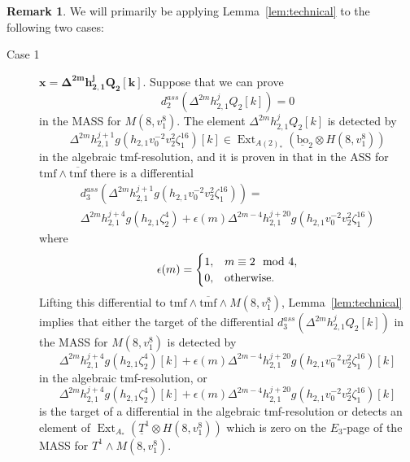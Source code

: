 \documentclass[10pt]{amsart}
\newcommand{\ul}[1]{\underline{#1}}
\newcommand{\br}[1]{\overline{#1}}
\newcommand{\tmf}{\mathrm{tmf}}
\newcommand{\bo}{\mathrm{bo}}
\newcommand{\bou}{\ul{\bo}}
\theoremstyle{definition}
\newtheorem{rmk}[equation]{Remark}
\numberwithin{equation}{section}
\numberwithin{figure}{section}
\DeclareMathOperator{\Ext}{Ext}
\begin{document}
\begin{rmk}\label{rmk:technical}
We will primarily be applying Lemma~\ref{lem:technical} to the following two cases:
\begin{description}
\item[Case 1] $\pmb{x = \Delta^{2m} h^{j}_{2,1}Q_2[k]}$.  Suppose that we can prove 
$$ d^{ass}_2(\Delta^{2m} h^{j}_{2,1}Q_2[k]) = 0 $$ 
in the MASS for $M(8,v_1^8)$.  The element $\Delta^{2m} h^{j}_{2,1}Q_2[k]$ is detected by 
$$ \Delta^{2m} h^{j+1}_{2,1} g(h_{2,1}v_0^{-2}v_2^2\zeta_1^{16})[k] \in \Ext_{A(2)_*}(\bou_2 \otimes H(8,v_1^8)) $$
in the algebraic tmf-resolution, and it is proven in \cite{BOSS} that in the ASS for $\tmf \wedge \br{\tmf}$ there is a differential
\begin{multline*}
d^{ass}_3(\Delta^{2m} h^{j+1}_{2,1} g(h_{2,1}v_0^{-2}v_2^2\zeta_1^{16})) = \\ \Delta^{2m} h^{j+4}_{2,1} g(h_{2,1}\zeta_2^4) + \epsilon(m) \Delta^{2m-4}h^{j+20}_{2,1} g(h_{2,1}v_0^{-2}v_2^2\zeta_1^{16}) 
\end{multline*}
where
$$ 
\epsilon(m) = 
\begin{cases}
1, & m \equiv 2 \mod 4, \\
0, & \rm{otherwise}.  
\end{cases}
$$
Lifting this differential to $\tmf \wedge \br{\tmf} \wedge M(8,v_1^8)$,  Lemma~\ref{lem:technical} implies that either the target of the differential $d^{ass}_3(\Delta^{2m} h^{j}_{2,1}Q_2[k])$ in the MASS for $M(8,v_1^8)$ is detected by
$$ \Delta^{2m} h^{j+4}_{2,1} g(h_{2,1}\zeta_2^4)[k]+\epsilon(m) \Delta^{2m-4} h^{j+20}_{2,1} g(h_{2,1}v_0^{-2}v_2^2\zeta_1^{16})[k] $$
in the algebraic tmf-resolution, or 
$$ \Delta^{2m} h^{j+4}_{2,1} g(h_{2,1}\zeta_2^4)[k]+\epsilon(m) \Delta^{2m-4} h^{j+20}_{2,1} g(h_{2,1}v_0^{-2}v_2^2\zeta_1^{16})[k] $$ 
is the target of a differential in the algebraic tmf-resolution or detects an element of $\Ext_{A_*}(\ul{T}^1 \otimes H(8,v_1^8))$ which is zero on the $E_3$-page of the MASS for $T^1 \wedge M(8,v_1^8)$.
\vspace{10pt}


\end{description}
\end{rmk}
\end{document}
